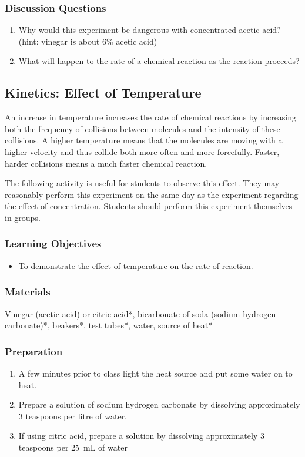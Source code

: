 \subsubsection*{Discussion Questions}
\begin{enumerate}
\item{Why would this experiment be dangerous with concentrated acetic acid? (hint: vinegar is about 6\% acetic acid)}
\item{What will happen to the rate of a chemical reaction as the reaction proceeds?}
\end{enumerate}

\subsection{Kinetics: Effect of Temperature}

An increase in temperature increases the rate of chemical reactions by increasing both the frequency of collisions between molecules and the intensity of these collisions. A higher temperature means that the molecules are moving with a higher velocity and thus collide both more often and more forcefully. Faster, harder collisions means a much faster chemical reaction.

The following activity is useful for students to observe this effect. They may reasonably perform this experiment on the same day as the experiment regarding the effect of concentration. Students should perform this experiment themselves in groups.

\subsubsection*{Learning Objectives}
\begin{itemize}
\item{To demonstrate the effect of temperature on the rate of reaction.}
\end{itemize}

\subsubsection*{Materials}
Vinegar (acetic acid) or citric acid*, bicarbonate of soda (sodium hydrogen carbonate)*, beakers*, test tubes*, water, source of heat*

\subsubsection*{Preparation}
\begin{enumerate}
\item{A few minutes prior to class light the heat source and put some water on to heat.}
\item{Prepare a solution of sodium hydrogen carbonate by dissolving approximately 3 teaspoons per litre of water.}
\item{If using citric acid, prepare a solution by dissolving approximately 3 teaspoons per 25~mL of water}
\end{enumerate}


